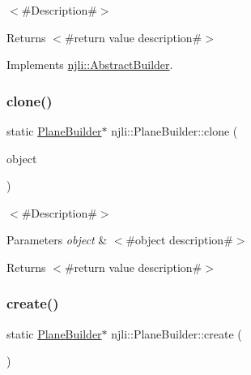 $<$\#\+Description\#$>$

\begin{DoxyReturn}{Returns}
$<$\#return value description\#$>$ 
\end{DoxyReturn}


Implements \mbox{\hyperlink{classnjli_1_1_abstract_builder_aa1d220053e182c37b31b427499c6eacf}{njli\+::\+Abstract\+Builder}}.

\mbox{\label{classnjli_1_1_plane_builder_ad187a59e424005f39f7b33bb4523226d}} 
\subsubsection{\texorpdfstring{clone()}{clone()}}
{\footnotesize\ttfamily static \mbox{\hyperlink{classnjli_1_1_plane_builder}{Plane\+Builder}}$\ast$ njli\+::\+Plane\+Builder\+::clone (\begin{DoxyParamCaption}\item[{const \mbox{\hyperlink{classnjli_1_1_plane_builder}{Plane\+Builder}} \&}]{object }\end{DoxyParamCaption})\hspace{0.3cm}{\ttfamily [static]}}

$<$\#\+Description\#$>$


\begin{DoxyParams}{Parameters}
{\em object} & $<$\#object description\#$>$\\
\hline
\end{DoxyParams}
\begin{DoxyReturn}{Returns}
$<$\#return value description\#$>$ 
\end{DoxyReturn}
\mbox{\label{classnjli_1_1_plane_builder_ac9fc17fac1451f36137b88c11866a55e}} 
\subsubsection{\texorpdfstring{create()}{create()}}
{\footnotesize\ttfamily static \mbox{\hyperlink{classnjli_1_1_plane_builder}{Plane\+Builder}}$\ast$ njli\+::\+Plane\+Builder\+::create (\begin{DoxyParamCaption}{ }\end{DoxyParamCaption})\hspace{0.3cm}{\ttfamily [static]}}

